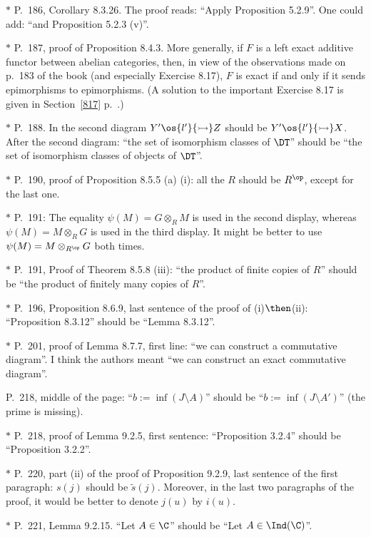 \documentclass[12pt]{article}
\theoremstyle{remark}
\theoremstyle{definition}
\begin{document}
\nn$*$ P.~186, Corollary 8.3.26. The proof reads: ``Apply Proposition 5.2.9''. One could add: ``and Proposition 5.2.3 (v)''.

\nn$*$ P.~187, proof of Proposition 8.4.3. More generally, if $F$ is a left exact additive functor between abelian categories, then, in view of the observations made on p.~183 of the book (and especially Exercise 8.17), $F$ is exact if and only if it sends epimorphisms to epimorphisms. (A solution to the important Exercise 8.17 is given in Section~\ref{817} p.~.)

\nn$*$ P.~188. In the second diagram $Y'\os{l'}{\rightarrowtail}Z$ should be $Y'\os{l'}{\rightarrowtail}X$. After the second diagram: ``the set of isomorphism classes of $\DT$'' should be ``the set of isomorphism classes of objects of $\DT$''.

\nn$*$ P.~190, proof of Proposition 8.5.5 (a) (i): all the $R$ should be $R^{\op}$, except for the last one.

\nn$*$ P.~191: The equality $\psi(M)=G\otimes_RM$ is used in the second display, whereas $\psi(M)=M\otimes_RG$ is used in the third display. It might be better to use $\psi(M)=M\otimes_{R^{\op}}G$ both times. 

\nn$*$ P.~191, Proof of Theorem 8.5.8 (iii): ``the product of finite copies of $R$'' should be ``the product of finitely many copies of $R$''.

\nn$*$ P.~196, Proposition 8.6.9, last sentence of the proof of (i)$\then$(ii): ``Proposition 8.3.12'' should be ``Lemma 8.3.12''.

\nn$*$ P.~201, proof of Lemma 8.7.7, first line: ``we can construct a commutative diagram''. I think the authors meant ``we can construct an exact commutative diagram''.

\begin{s}
P.~218, middle of the page: ``$b:=\inf(J\setminus A)$'' should be ``$b:=\inf(J\setminus A')$'' (the prime is missing).
\end{s}

\nn$*$ P.~218, proof of Lemma 9.2.5, first sentence: ``Proposition 3.2.4'' should be ``Proposition 3.2.2''. 

\nn$*$ P.~220, part (ii) of the proof of Proposition 9.2.9, last sentence of the first paragraph: $s(j)$ should be $\tilde s(j)$. Moreover, in the last two paragraphs of the proof, it would be better to denote $j(u)$ by $i(u)$. 

\nn$*$ P.~221, Lemma 9.2.15. ``Let $A\in\C$'' should be ``Let $A\in\Ind(\C)$''.
\end{document}

